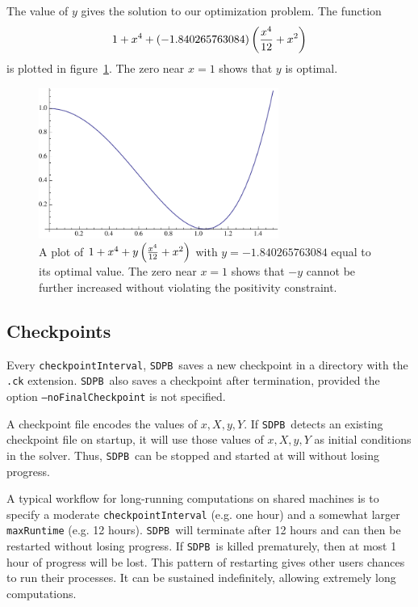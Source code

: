 \documentclass[12pt]{article}
\numberwithin{equation}{section}
\renewcommand{\be}{\begin{eqnarray}}
\renewcommand{\ee}{\end{eqnarray}}
\newcommand\SDPB{\texttt{SDPB}}
\begin{document}
The value of $y$ gives the solution to our optimization problem.  The function
\be
1+x^4 + (-1.840265763084)\p{\frac{x^4}{12} + x^2}
\ee
is plotted in figure~\ref{fig:plot}.  The zero near $x=1$ shows that $y$ is optimal.

\begin{figure}
\begin{center}
\includegraphics[width=0.7\textwidth]{optimizationplot}
\end{center}
\caption{A plot of $1+x^4 + y\left ( \frac{x^4}{12} + x^2 \right )$ with $y=-1.840265763084$ equal to its optimal value.  The zero near $x=1$ shows that $-y$ cannot be further increased without violating the positivity constraint.}
\label{fig:plot}
\end{figure}

\subsection{Checkpoints}

Every \texttt{checkpointInterval}, \SDPB\ saves a new checkpoint in a directory with the \texttt{.ck} extension.  \SDPB\ also saves a checkpoint after termination, provided the option \texttt{--noFinalCheckpoint} is not specified.  

A checkpoint file encodes the values of $x,X,y,Y$.  If \SDPB\ detects an existing checkpoint file on startup, it will use those values of $x,X,y,Y$ as initial conditions in the solver.  Thus, \SDPB\ can be stopped and started at will without losing progress.

A typical workflow for long-running computations on shared machines is to specify a moderate \texttt{checkpointInterval} (e.g. one hour) and a somewhat larger \texttt{maxRuntime} (e.g. 12 hours).  \SDPB\ will terminate after 12 hours and can then be restarted without losing progress.  If \SDPB\ is killed prematurely, then at most 1 hour of progress will be lost.  This pattern of restarting gives other users chances to run their processes.  It can be sustained indefinitely, allowing extremely long computations.
\end{document}
